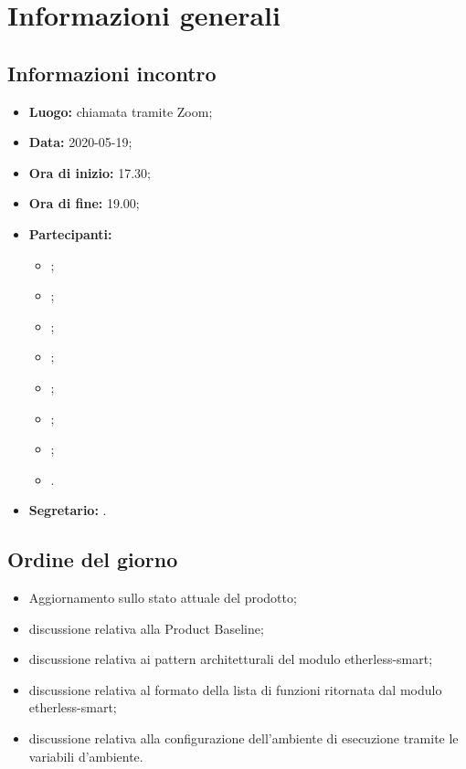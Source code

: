 \section{Informazioni generali}
\subsection{Informazioni incontro}
\begin{itemize}
	\item \textbf{Luogo:} chiamata tramite Zoom;
	\item \textbf{Data:} 2020-05-19;
	\item \textbf{Ora di inizio:} 17.30;
	\item \textbf{Ora di fine:} 19.00;
	\item \textbf{Partecipanti:}
		\begin{itemize}
			\item \VB;
			\item \LB;
			\item \NF;
			\item \EG;
			\item \FJ;
			\item \MP;
			\item \AS;
			\item \AZ.
		\end{itemize}
	\item \textbf{Segretario:} \AZ.
\end{itemize}

\subsection{Ordine del giorno}
\begin{itemize}
	\item Aggiornamento sullo stato attuale del prodotto;
	\item discussione relativa alla Product Baseline;
	\item discussione relativa ai pattern architetturali del modulo etherless-smart;
	\item discussione relativa al formato della lista di funzioni ritornata dal modulo etherless-smart;
	\item discussione relativa alla configurazione dell'ambiente di esecuzione tramite le variabili d'ambiente.
\end{itemize}
